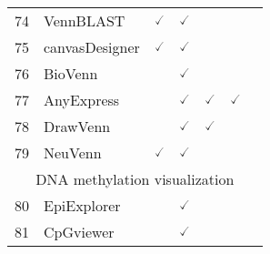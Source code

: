 \documentclass[10pt,letterpaper]{article}
\begin{document}
\begin{table}[!ht]
\begin{adjustwidth}{-2.25in}{0in}
\begin{tabular}{|c|l|c|c|c|c|c|}
74 & VennBLAST\cite{zahavi2015vennblast} & $\checked$ & $\checked$ & & & \\
75 & canvasDesigner\cite{zhang2018canvasdesigner} & $\checked$ & $\checked$ & & & \\
76 & BioVenn\cite{hulsen2008biovenn} & & $\checked$ & & & \\ 
77 & AnyExpress\cite{kim2011anyexpress} & & $\checked$ & $\checked$ & $\checked$ & \\ 
78 & DrawVenn\cite{carroll2000drawing} & & $\checked$ & $\checked$ & & \\ 
79 & NeuVenn\cite{gao2018neutools} & $\checked$ & $\checked$ & & & \\ \hline
\hline
\multicolumn{7}{|c|}{DNA methylation visualization} \\ \hline
\hline
80 & EpiExplorer\cite{halachev2012epiexplorer} & & $\checked$ & & & \\
81 & CpGviewer\cite{carr2007sequence} & & $\checked$ & & & \\ \hline
\end{tabular}
\label{table1}
\end{adjustwidth}
\end{table}
\end{document}
